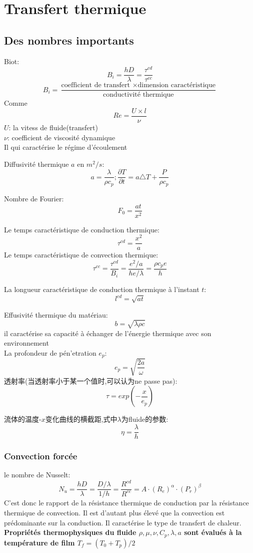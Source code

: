 \chapter{Transfert thermique}
\section{Des nombres importants}
Biot:$$B_i = \frac{ hD}{\lambda }=\frac{\tau^{cd}}{\tau^{cc}}$$
$$B_i = \frac{ \text{coefficient de transfert } \times \text{dimension caract\'eristique} }{\text{conductivit\'e thermique}}$$
Comme $$Re=\frac{U\times l}{\nu}$$
$U$: la vitess de fluide(transfert)\\
$\nu$: coefficient de viscosit\'e dynamique\\
Il qui caract\'erise le r\'egime d'\'ecoulement

Diffusivit\'e thermique $a$ en $m^2/s$:$$a=\frac{\lambda }{\rho c_p};\frac{\partial T}{\partial t}=a\triangle T + \frac{P}{\rho c_p}$$

Nombre de Fourier:$$F_0=\frac{ at}{x^2}$$

Le temps caract\'eristique de conduction thermique:$$\tau^{cd}=\frac{x^2}{a}$$
Le temps caract\'eristique de convection thermique:$$\tau^{cc}=\frac{\tau^{cd}}{B_i}=\frac{e^2/a }{he/\lambda }=\frac{\rho c_p e}{h}$$

La longueur caract\'eristique de conduction thermique \`a l'instant $t$:$$l^{cd}=\sqrt{at}$$

Effusivit\'e thermique du mat\'eriau:$$b=\sqrt{\lambda \rho c}$$
il caract\'erise sa capacit\'e \`a \'echanger de l'\'energie thermique avec son environnement\\

La profondeur de p\'en'etration $e_p$:$$e_p=\sqrt{\frac{2a}{\omega}}$$
透射率(当透射率小于某一个值时,可以认为ne passe pas):$$\tau = exp(-\frac{x}{e_p})$$


流体的温度-$x$变化曲线的横截距,式中$\lambda$为fluide的参数:$$\eta=\frac{\lambda }{h}$$

\subsection{Convection forc\'ee}
le nombre de Nusselt:$$N_u = \frac{hD}{\lambda }=\frac{D/\lambda }{1/h}=\frac{R^{cd}}{R^{cc}}=A\cdot (R_e)^{\alpha}\cdot (P_r)^{\beta}$$
C'est donc le rapport de la r\'esistance thermique de conduction par la r\'esistance thermique de convection. Il est d'autant plus \'elev\'e que la convection est pr\'edominante sur la conduction. Il caract\'erise le type de transfert
de chaleur.\\
\textbf{Propri\'et\'es thermophysiques du fluide $\rho, \mu, \nu, C_p, \lambda, a$ sont \'evalu\'es \`a la temp\'erature de film $T_f = (T_0 + T_p)/2$}

